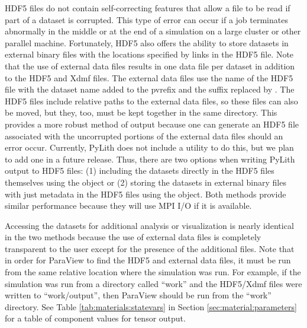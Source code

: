HDF5 files do not contain self-correcting features that allow a file
to be read if part of a dataset is corrupted. This type of error can
occur if a job terminates abnormally in the middle or at the end of a
simulation on a large cluster or other parallel machine. Fortunately,
HDF5 also offers the ability to store datasets in external binary
files with the locations specified by links in the HDF5 file. Note
that the use of external data files results in one data file per
dataset in addition to the HDF5 and Xdmf files. The external data
files use the name of the HDF5 file with the dataset name added to the
pvrefix and the  suffix replaced by . The
HDF5 files include relative paths to the external data files, so these
files can also be moved, but they, too, must be kept together in the
same directory. This provides a more robust method of output because
one can generate an HDF5 file associated with the uncorrupted portions
of the external data files should an error occur. Currently, PyLith
does not include a utility to do this, but we plan to add one in a
future release. Thus, there are two options when writing PyLith output
to HDF5 files: (1) including the datasets directly in the HDF5 files
themselves using the  object or (2) storing the
datasets in external binary files with just metadata in the HDF5 files
using the  object. Both methods provide
similar performance because they will use MPI I/O if it is available.


Accessing the datasets for additional analysis or visualization is
nearly identical in the two methods because the use of external data
files is completely transparent to the user except for the presence
of the additional files. Note that in order for ParaView to find the
HDF5 and external data files, it must be run from the same relative
location where the simulation was run. For example, if the simulation
was run from a directory called ``work'' and the HDF5/Xdmf files
were written to ``work/output'', then ParaView should be run from
the ``work'' directory. See Table \vref{tab:materials:statevars}
in Section \vref{sec:material:parameters} for a table of component
values for tensor output.

